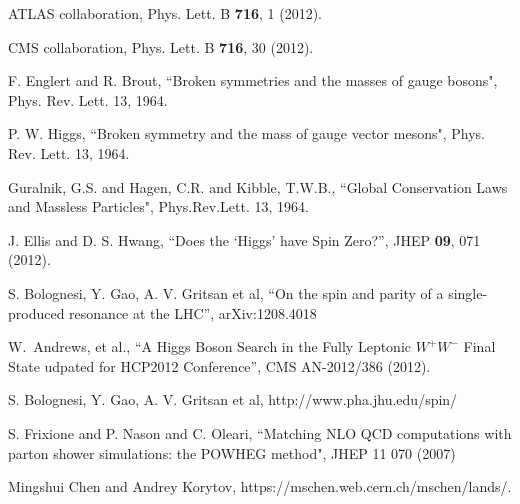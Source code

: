 \clearpage

\vspace*{-0.2cm}

ATLAS collaboration, Phys. Lett. B  {\bf 716}, 1 (2012).

CMS collaboration, Phys. Lett. B {\bf 716}, 30 (2012).



F. Englert and R. Brout, ``Broken symmetries and the masses of gauge bosons", Phys. Rev. Lett. 13,  1964.

P. W. Higgs, ``Broken symmetry and the mass of gauge vector mesons", Phys. Rev. Lett. 13, 1964.

Guralnik, G.S. and Hagen, C.R. and Kibble, T.W.B., ``Global Conservation Laws and Massless Particles", 
Phys.Rev.Lett. 13, 1964.

J. Ellis and D. S. Hwang, ``Does the `Higgs' have Spin Zero?'', JHEP {\bf 09}, 071 (2012). 

S. Bolognesi, Y. Gao, A. V. Gritsan et al, ``On the spin and parity of a single-produced resonance at the LHC'', arXiv:1208.4018


W.~Andrews, et al., ``A Higgs Boson Search in the Fully Leptonic $W^+W^-$ Final State udpated for HCP2012 Conference'', CMS AN-2012/386 (2012).

S. Bolognesi, Y. Gao, A. V. Gritsan et al, http://www.pha.jhu.edu/spin/

S. Frixione and P. Nason and C. Oleari, 
``Matching {NLO QCD} computations with parton shower simulations: the {POWHEG} method",
  JHEP 11 070 (2007)

Mingshui Chen and Andrey Korytov, https://mschen.web.cern.ch/mschen/lands/.


